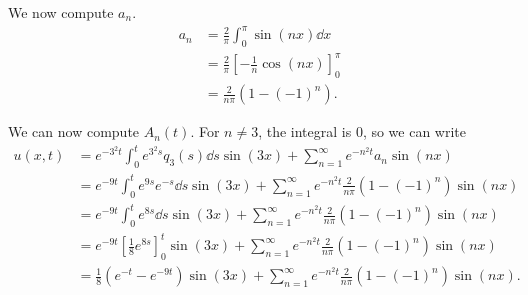 \documentclass[plain]{pset}
\begin{document}
\begin{solution}
    We now compute \(a_n\).
    \begin{align*}
        a_n & = \frac{2}{\pi}\int_0^\pi \sin(nx) \dd{x}              \\
            & = \frac{2}{\pi}\left[-\frac{1}{n}\cos(nx)\right]_0^\pi \\
            & = \frac{2}{n\pi}\left(1 - (-1)^n\right).
    \end{align*}

    We can now compute \(A_n(t)\). For \(n \neq 3\), the integral is 0, so we can write
    \begin{align*}
        u(x,t) & = e^{-3^2t}\int_0^t e^{3^2s}q_3(s) \dd{s}\sin(3x) + \sum_{n=1}^\infty e^{-n^2t}a_n\sin(nx)                                     \\
               & = e^{-9t}\int_0^t e^{9s}e^{-s} \dd{s}\sin(3x) + \sum_{n=1}^\infty e^{-n^2t}\frac{2}{n\pi}\left(1 - (-1)^n\right)\sin(nx)       \\
               & = e^{-9t}\int_0^t e^{8s} \dd{s}\sin(3x) + \sum_{n=1}^\infty e^{-n^2t}\frac{2}{n\pi}\left(1 - (-1)^n\right)\sin(nx)             \\
               & = e^{-9t}\left[\frac{1}{8}e^{8s}\right]_0^t\sin(3x) + \sum_{n=1}^\infty e^{-n^2t}\frac{2}{n\pi}\left(1 - (-1)^n\right)\sin(nx) \\
               & = \frac{1}{8}(e^{-t} - e^{-9t})\sin(3x) + \sum_{n=1}^\infty e^{-n^2t}\frac{2}{n\pi}\left(1 - (-1)^n\right)\sin(nx).
    \end{align*}
\end{solution}

\pagebreak
\end{document}
